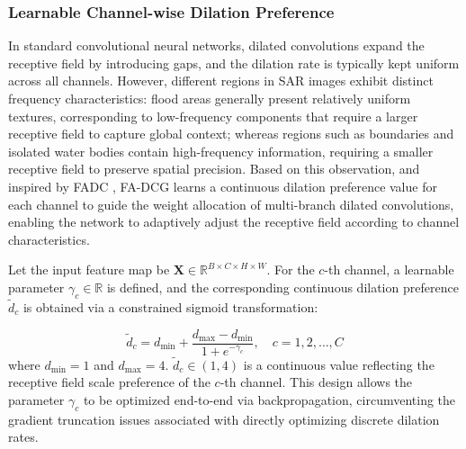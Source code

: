 \documentclass[lettersize,journal]{IEEEtran}
\begin{document}
\subsubsection{Learnable Channel-wise Dilation Preference}

In standard convolutional neural networks, dilated convolutions expand the receptive field by introducing gaps, and the dilation rate is typically kept uniform across all channels. However, different regions in SAR images exhibit distinct frequency characteristics: flood areas generally present relatively uniform textures, corresponding to low-frequency components that require a larger receptive field to capture global context; whereas regions such as boundaries and isolated water bodies contain high-frequency information, requiring a smaller receptive field to preserve spatial precision. Based on this observation, and inspired by FADC \cite{Chen2024FADC}, FA-DCG learns a continuous dilation preference value for each channel to guide the weight allocation of multi-branch dilated convolutions, enabling the network to adaptively adjust the receptive field according to channel characteristics.

Let the input feature map be $\mathbf{X} \in \mathbb{R}^{B \times C \times H \times W}$. For the $c$-th channel, a learnable parameter $\gamma_c \in \mathbb{R}$ is defined, and the corresponding continuous dilation preference $\tilde{d}_c$ is obtained via a constrained sigmoid transformation:

\begin{equation}
\tilde{d}_c = d_{\min} + \frac{d_{\max} - d_{\min}}{1 + e^{-\gamma_c}}, \quad c = 1,2,\ldots,C
\end{equation}
where $d_{\min}=1$ and $d_{\max}=4$. $\tilde{d}_c \in (1,4)$ is a continuous value reflecting the receptive field scale preference of the $c$-th channel. This design allows the parameter $\gamma_c$ to be optimized end-to-end via backpropagation, circumventing the gradient truncation issues associated with directly optimizing discrete dilation rates.
\end{document}
